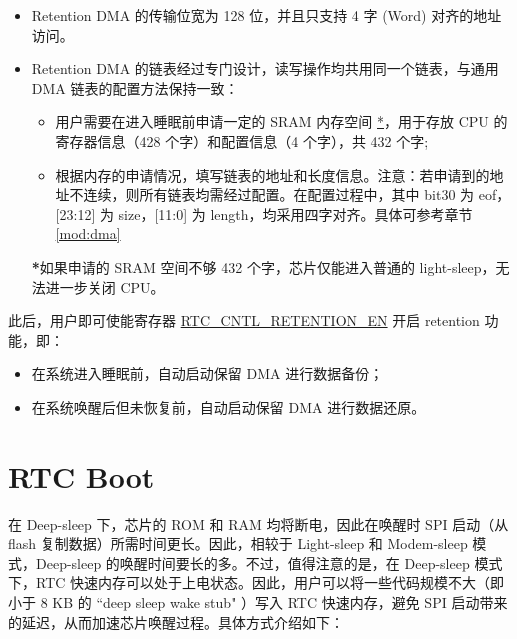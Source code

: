 \documentclass[main\_\_CN.tex]{subfiles}
\begin{document}
\begin{itemize}
    \item Retention DMA 的传输位宽为 128 位，并且只支持 4 字 (Word) 对齐的地址访问。
    \item Retention DMA 的链表经过专门设计，读写操作均共用同一个链表，与通用 DMA 链表的配置方法保持一致：
    \begin{itemize}
        \item 用户需要在进入睡眠前申请一定的 SRAM 内存空间 \hyperlink{dma-note1}{*}，用于存放 CPU 的寄存器信息（428 个字）和配置信息（4 个字），共 432 个字;
        \item 根据内存的申请情况，填写链表的地址和长度信息。注意：若申请到的地址不连续，则所有链表均需经过配置。在配置过程中，其中 bit30 为 eof，[23:12] 为 size，[11:0] 为 length，均采用四字对齐。具体可参考章节 \ref{mod:dma} \textit{}
\end{itemize}

\begin{tiplisting}\label{dma-note1}
\textbf{*}如果申请的 SRAM 空间不够 432 个字，芯片仅能进入普通的 light-sleep，无法进一步关闭 CPU。
\end{tiplisting}
\end{itemize}

此后，用户即可使能寄存器 \hyperref[fielddesc:RTCCNTLRETENTIONEN]{RTC\_CNTL\_RETENTION\_EN} 开启 retention 功能，即：
\begin{itemize}
    \item 在系统进入睡眠前，自动启动保留 DMA 进行数据备份；
    \item 在系统唤醒后但未恢复前，自动启动保留 DMA 进行数据还原。
\end{itemize}


\section{RTC Boot}

在 Deep-sleep 下，芯片的 ROM 和 RAM 均将断电，因此在唤醒时 SPI 启动（从 flash 复制数据）所需时间更长。因此，相较于 Light-sleep 和 Modem-sleep 模式，Deep-sleep 的唤醒时间要长的多。不过，值得注意的是，在 Deep-sleep 模式下，RTC 快速内存可以处于上电状态。因此，用户可以将一些代码规模不大（即小于 8 KB 的 ``deep sleep wake stub" ）写入 RTC 快速内存，避免 SPI 启动带来的延迟，从而加速芯片唤醒过程。具体方式介绍如下：
\end{document}
